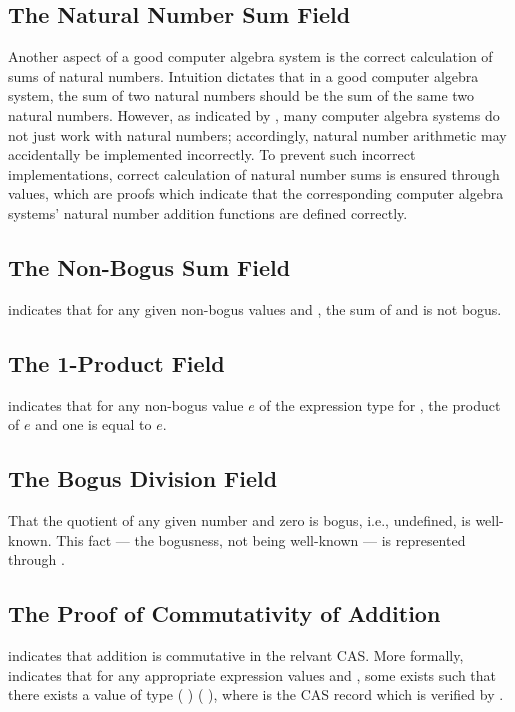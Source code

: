 \documentclass{report}
\begin{document}
\subsection{The Natural Number Sum Field}
Another aspect of a good computer algebra system is the correct calculation of sums of natural numbers.  Intuition dictates that in a good computer algebra system, the sum of two natural numbers should be the sum of the same two natural numbers.  However, as indicated by , many computer algebra systems do not just work with natural numbers; accordingly, natural number arithmetic may accidentally be implemented incorrectly.  To prevent such incorrect implementations, correct calculation of natural number sums is ensured through  values, which are proofs which indicate that the corresponding computer algebra systems' natural number addition functions are defined correctly.

\subsection{The Non-Bogus Sum Field}
 indicates that for any given non-bogus values  and , the sum of  and  is not bogus.

\subsection{The 1-Product Field}
  indicates that for any non-bogus value \(e\) of the expression type for , the product of \(e\) and one is equal to \(e\).

\subsection{The Bogus Division Field}
That the quotient of any given number and zero is bogus, i.e., undefined, is well-known.  This fact --- the bogusness, not being well-known --- is represented through .

\subsection{The Proof of Commutativity of Addition}
 indicates that addition is commutative in the relvant CAS.  More formally,   indicates that for any appropriate expression values  and , some  exists such that there exists a value of type   \AgdaSymbol(   \AgdaSymbol) \AgdaSymbol(   \AgdaSymbol), where  is the CAS record which is verified by .
\end{document}
